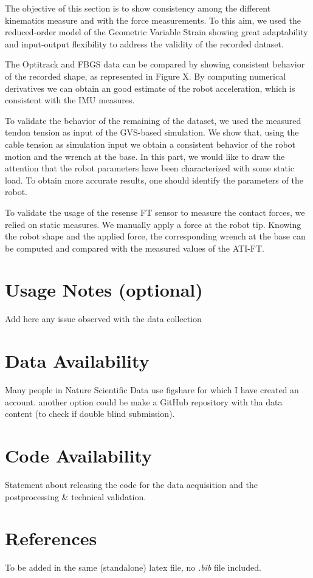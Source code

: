\documentclass[14pt, a4paper]{article}
\begin{document}
The objective of this section is to show consistency among the different kinematics measure and with the force measurements.
To this aim, we used the reduced-order model of the Geometric Variable Strain \cite{Boyer2021} showing great adaptability and input-output flexibility to address the validity of the recorded dataset.

The Optitrack and FBGS data can be compared by showing consistent behavior of the recorded shape, as represented in Figure X.
By computing numerical derivatives we can obtain an good estimate of the robot acceleration, which is consistent with the IMU measures.

To validate the behavior of the remaining of the dataset, we used the measured tendon tension as input of the GVS-based simulation.
We show that, using the cable tension as simulation input we obtain a consistent behavior of the robot motion and the wrench at the base.
In this part, we would like to draw the attention that the robot parameters have been characterized with some static load. 
To obtain more accurate results, one should identify the parameters of the robot.

To validate the usage of the resense FT sensor to measure the contact forces, we relied on static measures.
We manually apply a force at the robot tip. Knowing the robot shape and the applied force, the corresponding wrench at the base can be computed and compared with the measured values of the ATI-FT.


\section{Usage Notes (optional)}
Add here any issue observed with the data collection

\section{Data Availability}
Many people in Nature Scientific Data use figshare for which I have created an account.
another option could be make a GitHub repository with tha data content (to check if double blind submission).

\section{Code Availability}
Statement about releasing the code for the data acquisition and the postprocessing \& technical validation. 

\section{References}
To be added in the same (standalone) latex file, no \emph{.bib} file included.
\end{document}
